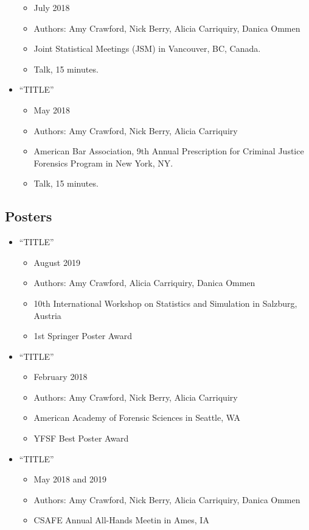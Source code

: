 \documentclass[]{book}
\providecommand{\tightlist}{%
  \setlength{\itemsep}{0pt}\setlength{\parskip}{0pt}}
\begin{document}
\begin{itemize}
  \begin{itemize}
  \tightlist
  \item
    July 2018
  \item
    Authors: Amy Crawford, Nick Berry, Alicia Carriquiry, Danica Ommen
  \item
    Joint Statistical Meetings (JSM) in Vancouver, BC, Canada.
  \item
    Talk, 15 minutes.
  \end{itemize}
\item
  ``TITLE''

  \begin{itemize}
  \tightlist
  \item
    May 2018
  \item
    Authors: Amy Crawford, Nick Berry, Alicia Carriquiry
  \item
    American Bar Association, 9th Annual Prescription for Criminal Justice Forensics Program in New York, NY.
  \item
    Talk, 15 minutes.
  \end{itemize}
\end{itemize}

\hypertarget{posters}{%
\subsection{Posters}\label{posters}}

\begin{itemize}
\tightlist
\item
  ``TITLE''

  \begin{itemize}
  \tightlist
  \item
    August 2019
  \item
    Authors: Amy Crawford, Alicia Carriquiry, Danica Ommen
  \item
    10th International Workshop on Statistics and Simulation in Salzburg, Austria
  \item
    1st Springer Poster Award
  \end{itemize}
\item
  ``TITLE''

  \begin{itemize}
  \tightlist
  \item
    February 2018
  \item
    Authors: Amy Crawford, Nick Berry, Alicia Carriquiry
  \item
    American Academy of Forensic Sciences in Seattle, WA
  \item
    YFSF Best Poster Award
  \end{itemize}
\item
  ``TITLE''

  \begin{itemize}
  \tightlist
  \item
    May 2018 and 2019
  \item
    Authors: Amy Crawford, Nick Berry, Alicia Carriquiry, Danica Ommen
  \item
    CSAFE Annual All-Hands Meetin in Ames, IA
  \end{itemize}
\end{itemize}
\end{document}

